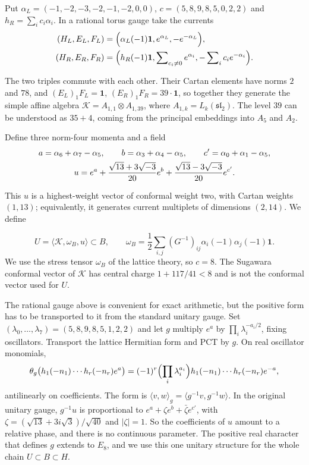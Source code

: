 \documentclass[11pt,a4paper]{article}
\newcommand{\one}{\mathbf1}
\begin{document}
Put $\alpha_L=(-1,-2,-3,-2,-1,-2,0,0)$,
$c=(5,8,9,8,5,0,2,2)$ and $h_R=\sum_i c_i\alpha_i$. In a rational
torus gauge take the currents
\begin{align}
 (H_L,E_L,F_L)&=\Bigl(\alpha_L(-1)\one,e^{\alpha_L},-e^{-\alpha_L}\Bigr),\label{eq:left}\\
 (H_R,E_R,F_R)&=\Bigl(h_R(-1)\one,
       \sum\nolimits_{c_i\ne0}e^{\alpha_i},-\sum\nolimits_i c_i e^{-\alpha_i}\Bigr).
       \label{eq:right}
\end{align}

The two triples commute with each other. Their Cartan elements have
norms $2$ and $78$, and $(E_L)_1F_L=\one$, $(E_R)_1F_R=39\cdot\one$, so
together they generate the simple affine algebra
$\mathcal K=A_{1,1}\otimes A_{1,39}$, where
$A_{1,k}=L_k(\mathfrak{sl}_2)$. The level $39$ can be understood as
$35+4$, coming from the principal embeddings into $A_5$ and $A_2$.


Define three norm-four momenta and a field
\begin{gather}
 a=\alpha_6+\alpha_7-\alpha_5,\qquad
 b=\alpha_3+\alpha_4-\alpha_5,\qquad
 c'=\alpha_0+\alpha_1-\alpha_5,\notag\\
 u=e^a+\frac{\sqrt{13}+3\sqrt{-3}}{20}e^b
          +\frac{\sqrt{13}-3\sqrt{-3}}{20}e^{c'}.
          \label{eq:u}
\end{gather}

This $u$ is a highest-weight vector of conformal weight two, with Cartan
weights $(1,13)$; equivalently, it generates current multiplets of
dimensions $(2,14)$. We define

\begin{equation}\label{eq:defU}
 \boxed{\quad U=\langle\mathcal K,\omega_B,u\rangle\subset B,\qquad
 \omega_B=\frac12\sum_{i,j}(G^{-1})_{ij}
               \alpha_i(-1)\alpha_j(-1)\one.\quad}
\end{equation}
We use the stress tensor $\omega_B$ of the lattice theory, so $c=8$.
The Sugawara conformal vector of $\mathcal K$ has central charge
$1+117/41<8$ and is not the conformal vector used for $U$.


The rational gauge above is convenient for exact arithmetic, but the
positive form has to be transported to it from the standard unitary
gauge. Set
$(\lambda_0,\ldots,\lambda_7)=(5,8,9,8,5,1,2,2)$
and let $g$ multiply $e^a$ by
$\prod_i\lambda_i^{-a_i/2}$, fixing oscillators. Transport the
lattice Hermitian form and PCT by $g$. On real oscillator monomials,
\begin{equation}\label{eq:PCT}
 \theta_g\bigl(h_1(-n_1)\cdots h_r(-n_r)e^a\bigr)
 =(-1)^r\Bigl(\prod_i\lambda_i^{a_i}\Bigr)
       h_1(-n_1)\cdots h_r(-n_r)e^{-a},
\end{equation}
antilinearly on coefficients. The form is
$\langle v,w\rangle_g=\langle g^{-1}v,g^{-1}w\rangle$.
In the original unitary gauge, $g^{-1}u$ is proportional to
$e^a+\zeta e^b+\bar\zeta e^{c'}$, with
$\zeta=(\sqrt{13}+3i\sqrt3)/\sqrt{40}$ and $|\zeta|=1$.
So the coefficients of $u$ amount to a relative phase, and there is no
continuous parameter. The positive real character that defines $g$
extends to $E_8$, and we use this one unitary structure for the whole
chain $U\subset B\subset H$.
\end{document}
